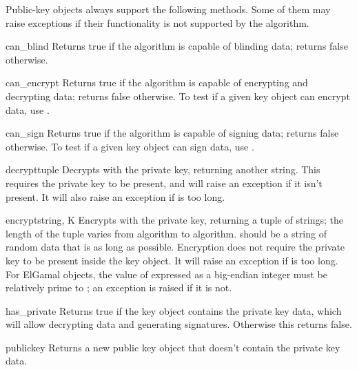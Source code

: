 \documentclass{howto}
\begin{document}
Public-key objects always support the following methods.  Some of them
may raise exceptions if their functionality is not supported by the
algorithm.

\begin{methoddesc}{can_blind}{}
Returns true if the algorithm is capable of blinding data; 
returns false otherwise.  
\end{methoddesc}

\begin{methoddesc}{can_encrypt}{}
Returns true if the algorithm is capable of encrypting and decrypting
data; returns false otherwise.  To test if a given key object can encrypt
data, use .
\end{methoddesc}

\begin{methoddesc}{can_sign}{}
Returns true if the algorithm is capable of signing data; returns false
otherwise.  To test if a given key object can sign data, use
.
\end{methoddesc}

\begin{methoddesc}{decrypt}{tuple}
Decrypts  with the private key, returning another string.
This requires the private key to be present, and will raise an exception
if it isn't present.  It will also raise an exception if  is
too long.
\end{methoddesc}

\begin{methoddesc}{encrypt}{string, K}
Encrypts  with the private key, returning a tuple of
strings; the length of the tuple varies from algorithm to algorithm.  
 should be a string of random data that is as long as
possible.  Encryption does not require the private key to be present
inside the key object.  It will raise an exception if  is
too long.  For ElGamal objects, the value of  expressed as a
big-endian integer must be relatively prime to ; an
exception is raised if it is not.
\end{methoddesc}

\begin{methoddesc}{has_private}{}
Returns true if the key object contains the private key data, which
will allow decrypting data and generating signatures.
Otherwise this returns false.
\end{methoddesc}

\begin{methoddesc}{publickey}{}
Returns a new public key object that doesn't contain the private key
data. 
\end{methoddesc}
\end{document}
